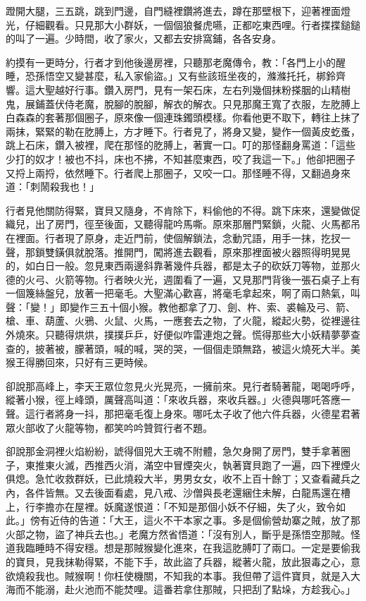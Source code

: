 蹬開大腿，三五跳，跳到門邊，自門縫裡鑽將進去，蹲在那壁根下，迎著裡面燈光，仔細觀看。只見那大小群妖，一個個狼餐虎嚥，正都吃東西哩。行者揲揲鎚鎚的叫了一遍。少時間，收了家火，又都去安排窩鋪，各各安身。

約摸有一更時分，行者才到他後邊房裡，只聽那老魔傳令，教：「各門上小的醒睡，恐孫悟空又變甚麼，私入家偷盜。」又有些該班坐夜的，滌滌托托，梆鈴齊響。這大聖越好行事。鑽入房門，見有一架石床，左右列幾個抹粉搽胭的山精樹鬼，展鋪蓋伏侍老魔，脫腳的脫腳，解衣的解衣。只見那魔王寬了衣服，左肐膊上白森森的套著那個圈子，原來像一個連珠鐲頭模樣。你看他更不取下，轉往上抹了兩抹，緊緊的勒在肐膊上，方才睡下。行者見了，將身又變，變作一個黃皮虼蚤，跳上石床，鑽入被裡，爬在那怪的肐膊上，著實一口。叮的那怪翻身罵道：「這些少打的奴才！被也不抖，床也不拂，不知甚麼東西，咬了我這一下。」他卻把圈子又捋上兩捋，依然睡下。行者爬上那圈子，又咬一口。那怪睡不得，又翻過身來道：「刺鬧殺我也！」

行者見他關防得緊，寶貝又隨身，不肯除下，料偷他的不得。跳下床來，還變做促織兒，出了房門，徑至後面，又聽得龍吟馬嘶。原來那層門緊鎖，火龍、火馬都吊在裡面。行者現了原身，走近門前，使個解鎖法，念動咒語，用手一抹，扢扠一聲，那鎖雙鐄俱就脫落。推開門，闖將進去觀看，原來那裡面被火器照得明晃晃的，如白日一般。忽見東西兩邊斜靠著幾件兵器，都是太子的砍妖刀等物，並那火德的火弓、火箭等物。行者映火光，週圍看了一遍，又見那門背後一張石桌子上有一個篾絲盤兒，放著一把毫毛。大聖滿心歡喜，將毫毛拿起來，啊了兩口熱氣，叫聲：「變！」即變作三五十個小猴。教他都拿了刀、劍、杵、索、裘輪及弓、箭、槍、車、葫蘆、火鴉、火鼠、火馬，一應套去之物，了火龍，縱起火勢，從裡邊往外燒來。只聽得烘烘，撲撲乒乒，好便似咋雷連炮之聲。慌得那些大小妖精夢夢查查的，披著被，朦著頭，喊的喊，哭的哭，一個個走頭無路，被這火燒死大半。美猴王得勝回來，只好有三更時候。

卻說那高峰上，李天王眾位忽見火光晃亮，一擁前來。見行者騎著龍，喝喝呼呼，縱著小猴，徑上峰頭，厲聲高叫道：「來收兵器，來收兵器。」火德與哪吒答應一聲。這行者將身一抖，那把毫毛復上身來。哪吒太子收了他六件兵器，火德星君著眾火部收了火龍等物，都笑吟吟贊賀行者不題。

卻說那金洞裡火焰紛紛，諕得個兕大王魂不附體，急欠身開了房門，雙手拿著圈子，東推東火滅，西推西火消，滿空中冒煙突火，執著寶貝跑了一遍，四下裡煙火俱熄。急忙收救群妖，已此燒殺大半，男男女女，收不上百十餘丁；又查看藏兵之內，各件皆無。又去後面看處，見八戒、沙僧與長老還綑住未解，白龍馬還在槽上，行李擔亦在屋裡。妖魔遂恨道：「不知是那個小妖不仔細，失了火，致令如此。」傍有近侍的告道：「大王，這火不干本家之事。多是個偷營劫寨之賊，放了那火部之物，盜了神兵去也。」老魔方然省悟道：「沒有別人，斷乎是孫悟空那賊。怪道我臨睡時不得安穩。想是那賊猴變化進來，在我這肐膊叮了兩口。一定是要偷我的寶貝，見我抹勒得緊，不能下手，故此盜了兵器，縱著火龍，放此狠毒之心，意欲燒殺我也。賊猴啊！你枉使機關，不知我的本事。我但帶了這件寶貝，就是入大海而不能溺，赴火池而不能焚哩。這番若拿住那賊，只把刮了點垛，方趁我心。」

